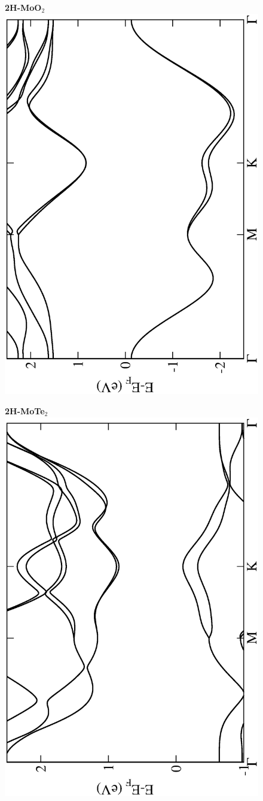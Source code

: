 \begin{figure}[htbp]
\centering
{\bfseries \sffamily 2H-MoO$_{2}$}\\
\includegraphics[width=0.45\linewidth, angle=-90, trim={2.9cm, 0cm, 2cm, 0cm}, clip]{img/SI_figs/BS/2H-MoO2.eps}
\end{figure}

\begin{figure}[htbp]
\centering
{\bfseries \sffamily 2H-MoTe$_{2}$}\\
\includegraphics[width=0.45\linewidth, angle=-90, trim={2.9cm, 0cm, 2cm, 0cm}, clip]{img/SI_figs/BS/2H-MoTe2.eps}
\end{figure}

